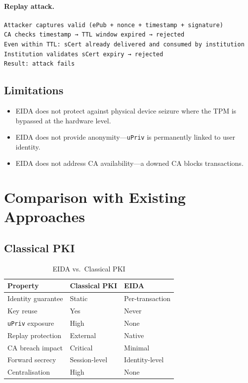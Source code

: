 \documentclass[11pt,a4paper]{article}
\begin{document}
\paragraph{Replay attack.}
\begin{lstlisting}[style=protocol]
Attacker captures valid (ePub + nonce + timestamp + signature)
CA checks timestamp → TTL window expired → rejected
Even within TTL: sCert already delivered and consumed by institution
Institution validates sCert expiry → rejected
Result: attack fails
\end{lstlisting}

\subsection{Limitations}

\begin{itemize}
  \item EIDA does not protect against physical device seizure where the TPM is
        bypassed at the hardware level.
  \item EIDA does not provide anonymity---\texttt{uPriv} is permanently linked
        to user identity.
  \item EIDA does not address CA availability---a downed CA blocks
        transactions.
\end{itemize}

\section{Comparison with Existing Approaches}

\subsection{Classical PKI}

\begin{table}[ht]
\centering
\caption{EIDA vs.\ Classical PKI}
\label{tab:pki}
\begin{tabular}{lll}
  \toprule
  \textbf{Property}       & \textbf{Classical PKI} & \textbf{EIDA}      \\
  \midrule
  Identity guarantee      & Static                 & Per-transaction    \\
  Key reuse               & Yes                    & Never              \\
  \texttt{uPriv} exposure & High                   & None               \\
  Replay protection       & External               & Native             \\
  CA breach impact        & Critical               & Minimal            \\
  Forward secrecy         & Session-level          & Identity-level     \\
  Centralisation          & High                   & None               \\
  \bottomrule
\end{tabular}
\end{table}
\end{document}
